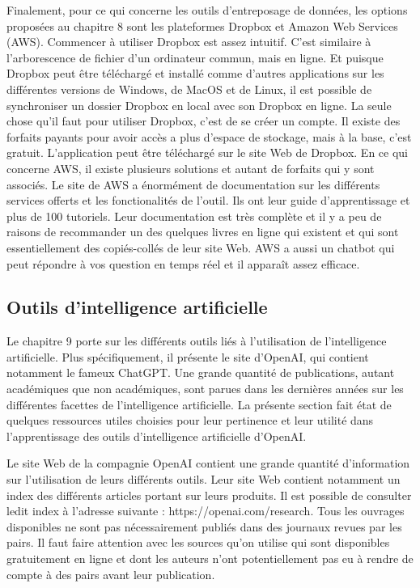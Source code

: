 \documentclass[
  letterpaper,
  DIV=11,
  numbers=noendperiod]{scrreprt}
\begin{document}
Finalement, pour ce qui concerne les outils d'entreposage de données,
les options proposées au chapitre 8 sont les plateformes Dropbox et
Amazon Web Services (AWS). Commencer à utiliser Dropbox est assez
intuitif. C'est similaire à l'arborescence de fichier d'un ordinateur
commun, mais en ligne. Et puisque Dropbox peut être téléchargé et
installé comme d'autres applications sur les différentes versions de
Windows, de MacOS et de Linux, il est possible de synchroniser un
dossier Dropbox en local avec son Dropbox en ligne. La seule chose qu'il
faut pour utiliser Dropbox, c'est de se créer un compte. Il existe des
forfaits payants pour avoir accès a plus d'espace de stockage, mais à la
base, c'est gratuit. L'application peut être téléchargé sur le site Web
de Dropbox. En ce qui concerne AWS, il existe plusieurs solutions et
autant de forfaits qui y sont associés. Le site de AWS a énormément de
documentation sur les différents services offerts et les fonctionalités
de l'outil. Ils ont leur guide d'apprentissage et plus de 100 tutoriels.
Leur documentation est très complète et il y a peu de raisons de
recommander un des quelques livres en ligne qui existent et qui sont
essentiellement des copiés-collés de leur site Web. AWS a aussi un
chatbot qui peut répondre à vos question en temps réel et il apparaît
assez efficace.

\subsection{Outils d'intelligence
artificielle}\label{outils-dintelligence-artificielle-1}

Le chapitre 9 porte sur les différents outils liés à l'utilisation de
l'intelligence artificielle. Plus spécifiquement, il présente le site
d'OpenAI, qui contient notamment le fameux ChatGPT. Une grande quantité
de publications, autant académiques que non académiques, sont parues
dans les dernières années sur les différentes facettes de l'intelligence
artificielle. La présente section fait état de quelques ressources
utiles choisies pour leur pertinence et leur utilité dans
l'apprentissage des outils d'intelligence artificielle d'OpenAI.

Le site Web de la compagnie OpenAI contient une grande quantité
d'information sur l'utilisation de leurs différents outils. Leur site
Web contient notamment un index des différents articles portant sur
leurs produits. Il est possible de consulter ledit index à l'adresse
suivante : https://openai.com/research. Tous les ouvrages disponibles ne
sont pas nécessairement publiés dans des journaux revues par les pairs.
Il faut faire attention avec les sources qu'on utilise qui sont
disponibles gratuitement en ligne et dont les auteurs n'ont
potentiellement pas eu à rendre de compte à des pairs avant leur
publication.
\end{document}
